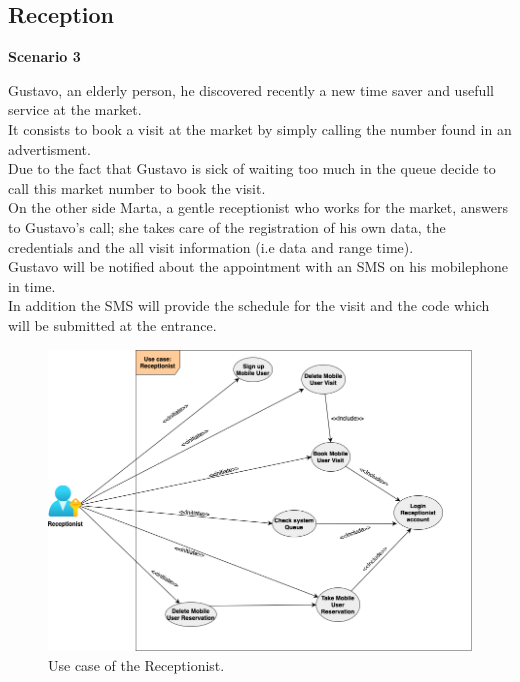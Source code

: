 \pagebreak

\subsection{Reception}
\par \medskip
{\normalsize \textbf{Scenario 3}}
\par \medskip
 Gustavo, an elderly person, he discovered recently a new time saver and usefull service at the market. \\
 It consists to book a visit at the market by simply calling the number found in an advertisment. \\
 Due to the fact that Gustavo is sick of waiting too much in the queue decide to call this market number to book the visit. \\
 On the other side Marta, a gentle receptionist who works for the market, answers to Gustavo's call; she takes care of the registration of his own data, the credentials and the all visit information (i.e data and range time).\\
Gustavo will be notified about the appointment with an SMS on his mobilephone in time. \\
  In addition the SMS will provide the schedule for the visit and the code which will be submitted at the entrance.
 
\bigbreak

 
 
 \begin{figure}[H]
 	\caption{Use case of the Receptionist.}
 	\label{fig:UML}
 	
 	\centering
 	\includegraphics[scale = 0.5]{diagrams/UseCaseReception.png}
 	
 \end{figure}

